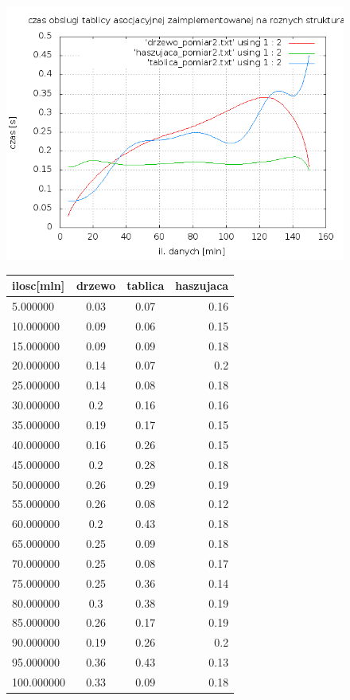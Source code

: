 \documentclass[a4paper,11pt]{report}
\begin{document}
\begin{figure}
    \includegraphics[scale=0.5]{./czas_dzialania_algorytmow2.png}
    \label{fig:}
    \caption{}
         \begin{tabular}{|l|c|c|r|}
\hline
ilosc[mln]&	drzewo&	tablica&	haszujaca\\\hline
5.000000 &	0.03&	0.07&	0.16\\
10.000000&	0.09&	0.06&	0.15\\
15.000000&	0.09&	0.09&	0.18\\
20.000000&	0.14&	0.07&	0.2\\
25.000000&	0.14&	0.08&	0.18\\
30.000000&	0.2&	0.16&	0.16\\
35.000000&	0.19&	0.17&	0.15\\
40.000000&	0.16&	0.26&	0.15\\
45.000000&	0.2&	0.28&	0.18\\
50.000000&	0.26&	0.29&	0.19\\
55.000000&	0.26&	0.08&	0.12\\
60.000000&	0.2&	0.43&	0.18\\
65.000000&	0.25&	0.09&	0.18\\
70.000000&	0.25&	0.08&	0.17\\
75.000000&	0.25&	0.36&	0.14\\
80.000000&	0.3&	0.38&	0.19\\
85.000000&	0.26&	0.17&	0.19\\
90.000000&	0.19&	0.26&	0.2\\
95.000000&	0.36&	0.43&	0.13\\
100.000000&	0.33&	0.09&	0.18\\

\end{tabular}
\end{figure}
\end{document}
